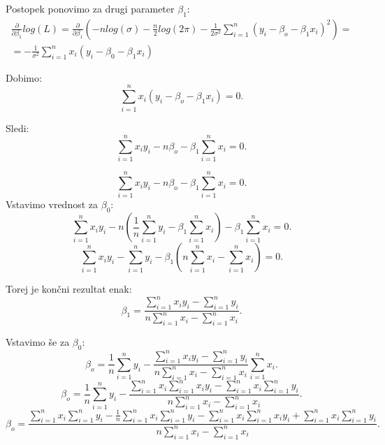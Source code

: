 \documentclass{article}
\begin{document}
Postopek ponovimo za drugi parameter $\beta_1$:
\begin{equation*}
\begin{split}
\frac{\partial}{\partial\beta_1} log(L) = \frac{\partial}{\partial\beta_1} (  -nlog(\sigma) - \frac{n}{2}log(2\pi)-\frac{1}{2\sigma^2}\sum_{i=1}^n (y_i-\beta_o-\beta_1x_i)^2)=\\
= -\frac{1}{\sigma^2}\sum_{i=1}^n x_i(y_i-\beta_0-\beta_1x_i)
\end{split}
\end{equation*}

Dobimo:
\begin{equation*}
\sum_{i=1}^nx_i(y_i-\beta_o-\beta_1x_i) = 0.
\end{equation*}

Sledi:
\begin{equation*}
\sum_{i=1}^nx_iy_i-n\beta_o-\beta_1\sum_{i=1}^nx_i = 0.
\end{equation*}

\begin{equation*}
\sum_{i=1}^nx_iy_i-n\beta_o-\beta_1\sum_{i=1}^nx_i = 0.
\end{equation*}
Vstavimo vrednost za $\beta_0$:
\begin{equation*}
\sum_{i=1}^nx_iy_i-n\left(\frac{1}{n} \sum_{i=1}^n y_i - \beta_1\sum_{i=1}^nx_i\right)-\beta_1\sum_{i=1}^nx_i = 0.
\end{equation*}
\begin{equation*}
\sum_{i=1}^nx_iy_i- \sum_{i=1}^n y_i - \beta_1\left(n\sum_{i=1}^nx_i-\sum_{i=1}^nx_i\right) = 0.
\end{equation*}


Torej je končni rezultat enak:
\begin{equation*}
\beta_1 = \frac{\sum_{i=1}^nx_iy_i- \sum_{i=1}^n y_i}{n\sum_{i=1}^nx_i-\sum_{i=1}^nx_i}.
\end{equation*}

Vstavimo še za $\beta_0$:
\begin{equation*}
\beta_o = \frac{1}{n} \sum_{i=1}^n y_i -  \frac{\sum_{i=1}^nx_iy_i- \sum_{i=1}^n y_i}{n\sum_{i=1}^nx_i-\sum_{i=1}^nx_i}\sum_{i=1}^nx_i.
\end{equation*}
\begin{equation*}
\beta_o = \frac{1}{n} \sum_{i=1}^n y_i -  \frac{\sum_{i=1}^nx_i\sum_{i=1}^nx_iy_i- \sum_{i=1}^nx_i\sum_{i=1}^n y_i}{n\sum_{i=1}^nx_i-\sum_{i=1}^nx_i}.
\end{equation*}
\begin{equation*}
\beta_o = \frac{\sum_{i=1}^nx_i\sum_{i=1}^ny_i - \frac{1}{n}\sum_{i=1}^nx_i\sum_{i=1}^ny_i    -\sum_{i=1}^nx_i\sum_{i=1}^nx_iy_i+ \sum_{i=1}^nx_i\sum_{i=1}^n y_i}{n\sum_{i=1}^nx_i-\sum_{i=1}^nx_i}.
\end{equation*}
\end{document}

